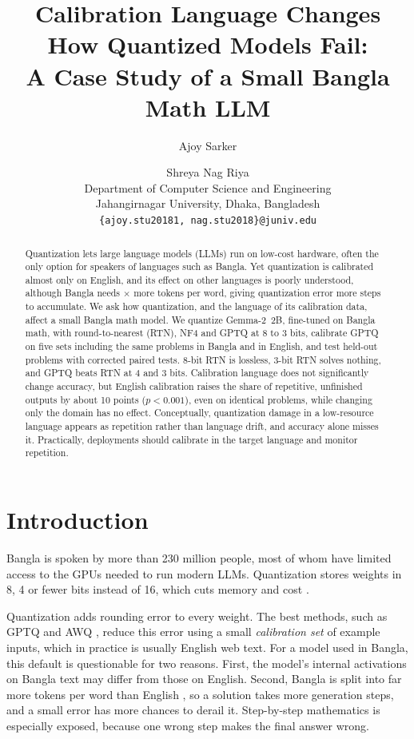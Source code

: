 \documentclass[11pt]{article}
\title{Calibration Language Changes How Quantized Models Fail:\\A Case Study of a Small {Bangla} Math {LLM}}
\author{Ajoy Sarker \and Shreya Nag Riya \\
  Department of Computer Science and Engineering \\
  Jahangirnagar University, Dhaka, Bangladesh \\
  \texttt{\{ajoy.stu20181, nag.stu2018\}@juniv.edu}}
\begin{document}
\maketitle

\begin{abstract}
Quantization lets large language models (LLMs) run on low-cost hardware, often the only option for speakers of languages such as Bangla.
Yet quantization is calibrated almost only on English, and its effect on other languages is poorly understood, although Bangla needs \FertRatio$\times$ more tokens per word, giving quantization error more steps to accumulate.
We ask how quantization, and the language of its calibration data, affect a small Bangla math model.
We quantize Gemma-2~2B, fine-tuned on Bangla math, with round-to-nearest (RTN), NF4 and GPTQ at 8 to 3 bits, calibrate GPTQ on five sets including the same problems in Bangla and in English, and test \NumEval{} held-out problems with corrected paired tests.
8-bit RTN is lossless, 3-bit RTN solves nothing, and GPTQ beats RTN at 4 and 3 bits. Calibration language does not significantly change accuracy, but English calibration raises the share of repetitive, unfinished outputs by about 10 points ($p<0.001$), even on identical problems, while changing only the domain has no effect.
Conceptually, quantization damage in a low-resource language appears as repetition rather than language drift, and accuracy alone misses it. Practically, deployments should calibrate in the target language and monitor repetition.
\end{abstract}

\section{Introduction}

Bangla is spoken by more than 230 million people, most of whom have limited access to the GPUs needed to run modern LLMs. Quantization stores weights in 8, 4 or fewer bits instead of 16, which cuts memory and cost \citep{dettmers2022llmint8,frantar2023gptq}.

Quantization adds rounding error to every weight. The best methods, such as GPTQ \citep{frantar2023gptq} and AWQ \citep{lin2024awq}, reduce this error using a small \emph{calibration set} of example inputs, which in practice is usually English web text. For a model used in Bangla, this default is questionable for two reasons. First, the model's internal activations on Bangla text may differ from those on English. Second, Bangla is split into far more tokens per word than English \citep{petrov2023tokenizer,ahia2023languages}, so a solution takes more generation steps, and a small error has more chances to derail it. Step-by-step mathematics is especially exposed, because one wrong step makes the final answer wrong.
\end{document}
